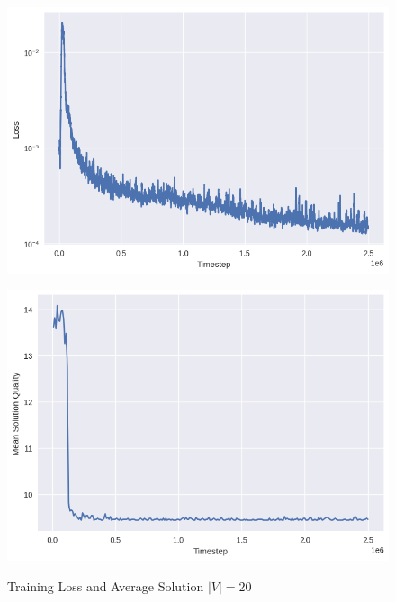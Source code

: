 \documentclass{article}
\begin{document}
\begin{figure}[ht]
    \caption{Training Loss and Average Solution $|V| = 20$}
    \centering
    \includegraphics[scale=0.5]{../ER_20spin/eco/min_cover/network/loss.png}

    \includegraphics[scale=0.5]{../ER_20spin/eco/min_cover/network/training_curve.png}
    \label{fig:training-mvc-20}
\end{figure}
\end{document}
